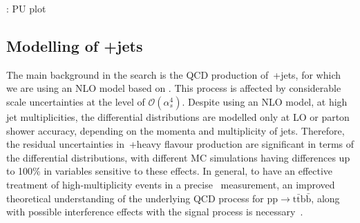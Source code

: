 \fixme: PU plot

\subsection{Modelling of \ttbar+jets}
\label{sec:ttbar_subprocesses}
The main background in the \ttHbb search is the QCD production of~\ttbar+jets, for which we are using an NLO model based on \powheg. This process is affected by considerable scale uncertainties at the level of $\mathcal{O}(\alpha_s^4)$. Despite using an NLO model, at high jet multiplicities, the differential distributions are modelled only at LO or parton shower accuracy, depending on the momenta and multiplicity of jets. Therefore, the residual uncertainties in~\ttbar+heavy flavour production are significant in terms of the differential distributions, with different MC simulations having differences up to 100\% in variables sensitive to these effects. In general, to have an effective treatment of high-multiplicity events in a precise~\ttHbb\xspace measurement, an improved theoretical understanding of the underlying QCD process for $\mathrm{pp} \rightarrow \mathrm{t\bar{t}b\bar{b}}$, along with possible interference effects with the signal process is necessary~\cite{Denner:2014wka}.

